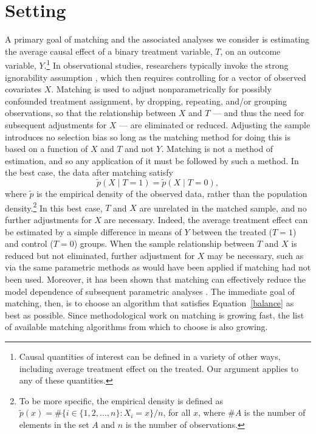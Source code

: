\documentclass[11pt,titlepage]{article}
\begin{document}
\section{Setting}
A primary goal of matching and the associated analyses we consider is
estimating the average causal effect of a binary treatment variable,
$T$, on an outcome variable, $Y$.\footnote{Causal quantities of
  interest can be defined in a variety of other ways, including
  average treatment effect on the treated.  Our argument applies to
  any of these quantities.}  In observational studies, researchers
typically invoke the strong ignorability assumption \citep{RosRub83},
which then requires controlling for a vector of observed covariates
$X$.  Matching is used to adjust nonparametrically for possibly
confounded treatment assignment, by dropping, repeating, and/or
grouping observations, so that the relationship between $X$ and $T$
--- and thus the need for subsequent adjustments for $X$ --- are
eliminated or reduced.  Adjusting the sample introduces no selection
bias so long as the matching method for doing this is based on a
function of $X$ and $T$ and not $Y$.  Matching is not a method of
estimation, and so any application of it must be followed by such a
method.  In the best case, the data after matching satisfy
\begin{equation}
  \label{balance}
  \tilde p(X\mid T=1) = \tilde p(X\mid T=0),
\end{equation}
where $\tilde p$ is the empirical density of the observed data, rather
than the population density.\footnote{To be more specific, the
  empirical density is defined as $\tilde p(x) = \# \{ i\in \{1, 2,
  \dots, n \}: X_i = x \} / n$, for all $x$, where $\#A$ is the number
  of elements in the set $A$ and $n$ is the number of observations. }
In this best case, $T$ and $X$ are unrelated in the matched sample,
and no further adjustments for $X$ are necessary. Indeed, the average
treatment effect can be estimated by a simple difference in means of
$Y$ between the treated ($T=1$) and control ($T=0$) groups.  When the
sample relationship between $T$ and $X$ is reduced but not eliminated,
further adjustment for $X$ may be necessary, such as via the same
parametric methods as would have been applied if matching had not been
used. Moreover, it has been shown that matching can effectively reduce
the model dependence of subsequent parametric analyses
\citep{HoImaKin06}.  The immediate goal of matching, then, is to
choose an algorithm that satisfies Equation~\ref{balance} as best as
possible.  Since methodological work on matching is growing fast, the
list of available matching algorithms from which to choose is also
growing.
\end{document}
